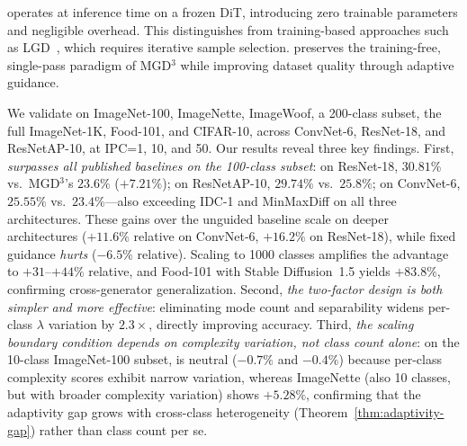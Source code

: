 \cags{} operates at inference time on a frozen DiT, introducing zero trainable parameters and negligible overhead. This distinguishes \ags{} from training-based approaches such as LGD~\cite{chansantiago2026learnabilityguided}, which requires iterative sample selection. \ags{} preserves the training-free, single-pass paradigm of MGD$^3$ while improving dataset quality through adaptive guidance.

We validate \ags{} on ImageNet-100, ImageNette, ImageWoof, a 200-class subset, the full ImageNet-1K, Food-101, and CIFAR-10, across ConvNet-6, ResNet-18, and ResNetAP-10, at IPC=1, 10, and 50. Our results reveal three key findings. First, \emph{\cags{} surpasses all published baselines on the 100-class subset}: on ResNet-18, $30.81\%$ vs.\ MGD$^3$'s $23.6\%$ ($+7.21\%$); on ResNetAP-10, $29.74\%$ vs.\ $25.8\%$; on ConvNet-6, $25.55\%$ vs.\ $23.4\%$---also exceeding IDC-1 and MinMaxDiff on all three architectures. These gains over the unguided baseline scale on deeper architectures ($+11.6\%$ relative on ConvNet-6, $+16.2\%$ on ResNet-18), while fixed guidance \emph{hurts} ($-6.5\%$ relative). Scaling to 1000 classes amplifies the advantage to $+31$--$+44\%$ relative, and Food-101 with Stable Diffusion~1.5 yields $+83.8\%$, confirming cross-generator generalization. Second, \emph{the two-factor design is both simpler and more effective}: eliminating mode count and separability widens per-class $\lambda$ variation by $2.3\times$, directly improving accuracy. Third, \emph{the scaling boundary condition depends on complexity variation, not class count alone}: on the 10-class ImageNet-100 subset, \cags{} is neutral ($-0.7\%$ and $-0.4\%$) because per-class complexity scores exhibit narrow variation, whereas ImageNette (also 10 classes, but with broader complexity variation) shows $+5.28\%$, confirming that the adaptivity gap grows with cross-class heterogeneity (Theorem~\ref{thm:adaptivity-gap}) rather than class count per se.
